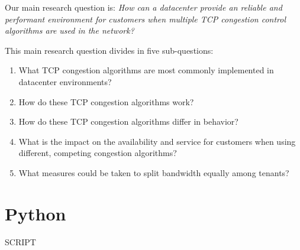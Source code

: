 \documentclass{article}
\begin{document}

Our main research question is:
{\it How can a datacenter provide an reliable and performant environment for
customers when multiple TCP congestion control algorithms are used in the
network?}

\vspace{0.5cm}

This main research question divides in five sub-questions:

\begin{enumerate}
	\item What TCP congestion algorithms are most commonly implemented in datacenter environments?
	\item How do these TCP congestion algorithms work?
	\item How do these TCP congestion algorithms differ in behavior?
	\item What is the impact on the availability and service for customers when using different, competing congestion algorithms?
	\item What measures could be taken to split bandwidth equally among tenants?
\end{enumerate}


\printbibliography

\appendix
\section{Python}
\label{appendix:python}
SCRIPT
\end{document}
